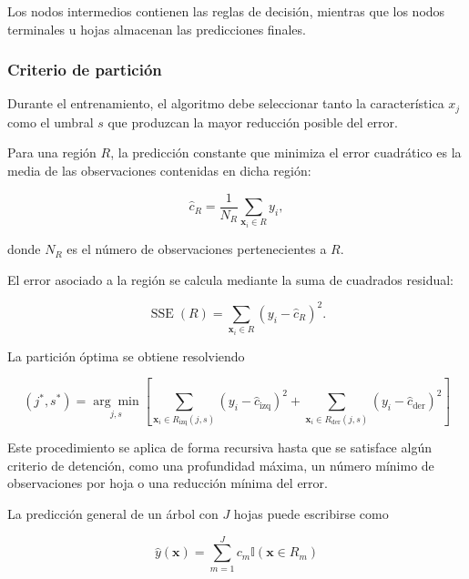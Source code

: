 Los nodos intermedios contienen las reglas de decisión, mientras que los nodos terminales u hojas almacenan las predicciones finales.

\subsubsection{Criterio de partición}

Durante el entrenamiento, el algoritmo debe seleccionar tanto la característica $x_j$ como el umbral $s$ que produzcan la mayor reducción posible del error.

Para una región $R$, la predicción constante que minimiza el error cuadrático es la media de las observaciones contenidas en dicha región:

\begin{equation}
\hat{c}_{R}
=
\frac{1}{N_R}
\sum_{\mathbf{x}_i\in R}
y_i,
\end{equation}

donde $N_R$ es el número de observaciones pertenecientes a $R$.

El error asociado a la región se calcula mediante la suma de cuadrados residual:

\begin{equation}
\operatorname{SSE}(R)
=
\sum_{\mathbf{x}_i\in R}
\left(
y_i-\hat{c}_{R}
\right)^2.
\end{equation}

La partición óptima se obtiene resolviendo

\begin{equation}
\boxed{
(j^{*},s^{*})
=
\underset{j,s}{\arg\min}
\left[
\sum_{\mathbf{x}_i\in R_{\mathrm{izq}}(j,s)}
\left(
y_i-\hat{c}_{\mathrm{izq}}
\right)^2
+
\sum_{\mathbf{x}_i\in R_{\mathrm{der}}(j,s)}
\left(
y_i-\hat{c}_{\mathrm{der}}
\right)^2
\right]
}
\label{eq:particion_arbol}
\end{equation}

Este procedimiento se aplica de forma recursiva hasta que se satisface algún criterio de detención, como una profundidad máxima, un número mínimo de observaciones por hoja o una reducción mínima del error.

La predicción general de un árbol con $J$ hojas puede escribirse como

\begin{equation}
\boxed{
\hat{y}(\mathbf{x})
=
\sum_{m=1}^{J}
c_m
\mathbb{I}
\left(
\mathbf{x}\in R_m
\right)
}
\label{eq:prediccion_arbol}
\end{equation}

